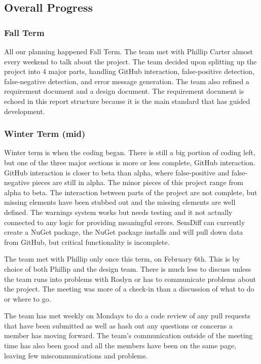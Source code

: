 \documentclass[10pt,draftclsnofoot,onecolumn]{IEEEtran}
\begin{document}
\subsection{Overall Progress}
\subsubsection{Fall Term}
All our planning happened Fall Term. The team met with Phillip Carter almost every weekend to talk about the project. The team decided upon splitting up the project into 4 major parts, handling GitHub interaction, false-positive detection, false-negative detection, and error message generation. The team also refined a requirement document and a design document. The requirement document is echoed in this report structure because it is the main standard that has guided development.

\subsubsection{Winter Term (mid)}
Winter term is when the coding began. There is still a big portion of coding left, but one of the three major sections is more or less complete, GitHub interaction. GitHub interaction is closer to beta than alpha, where false-positive and false-negative pieces are still in alpha. The minor pieces of this project range from alpha to beta. The interaction between parts of the project are not complete, but missing elements have been stubbed out and the missing elements are well defined. The warnings system works but needs testing and it not actually connected to any logic for providing meaningful errors. SemDiff can currently create a NuGet package, the NuGet package installs and will pull down data from GitHub, but critical functionality is incomplete.

The team met with Phillip only once this term, on February 6th. This is by choice of both Phillip and the design team. There is much less to discuss unless the team runs into problems with Roslyn or has to communicate problems about the project. The meeting was more of a check-in than a discussion of what to do or where to go.

The team has met weekly on Mondays to do a code review of any pull requests that have been submitted as well as hash out any questions or concerns a member has moving forward. The team’s communication outside of the meeting time has also been good and all the members have been on the same page, leaving few miscommunications and problems.
\end{document}
